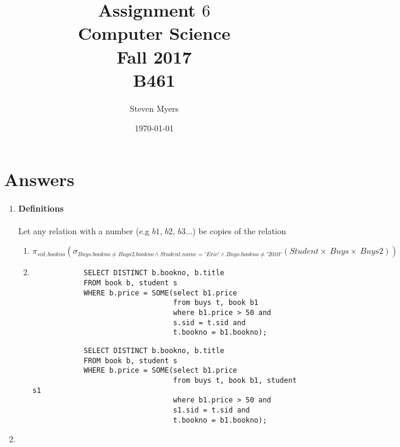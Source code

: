 \documentclass{article}
\begin{document}
\title{Assignment $6$\\ Computer Science \\ Fall 2017\\ B461}         %
\author{Steven Myers}        %
\date{\today}          %
\maketitle

\makeatother     %

\pagestyle{plain}

\section*{Answers}

\begin{enumerate}
    \item %
    \paragraph{Definitions}
    Let any relation with a number (e.g $b1$, $b2$, $b3$...) be copies of the relation
    \begin{enumerate}
        \item %
        \begin{displaymath}
            \pi_{sid, bookno}
                (\sigma_{Buys.bookno \ne Buys2.bookno \wedge Student.name='Eric' \wedge Buys.bookno \ne '2010'}
                    (Student \times\ Buys \times\ Buys2))
        \end{displaymath}

        \item %
        \begin{lstlisting}
            SELECT DISTINCT b.bookno, b.title
            FROM book b, student s
            WHERE b.price = SOME(select b1.price
                                 from buys t, book b1
                                 where b1.price > 50 and
                                 s.sid = t.sid and
                                 t.bookno = b1.bookno);
        \end{lstlisting}
        \begin{lstlisting}
            SELECT DISTINCT b.bookno, b.title
            FROM book b, student s
            WHERE b.price = SOME(select b1.price
                                 from buys t, book b1, student s1
                                 where b1.price > 50 and
                                 s1.sid = t.sid and
                                 t.bookno = b1.bookno);
        \end{lstlisting}

    \end{enumerate}

    \item


\end{enumerate}
\end{document}
